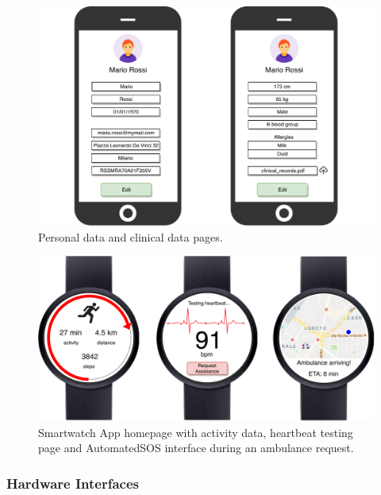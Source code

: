 \documentclass[12pt,a4paper]{article}
\begin{document}
					\begin{figure}[H]
						\centering
						\includegraphics[width=1.0\linewidth]{Images/data-pages}
						\caption{Personal data and clinical data pages.}
						\label{fig:data-pages}
					\end{figure}
					\begin{figure}[h]
						\centering
						\includegraphics[width=1.0\linewidth]{Images/smartwatch}
						\caption{Smartwatch App homepage with activity data, heartbeat testing page and AutomatedSOS interface during an ambulance request.}
						\label{fig:smartwatch}
					\end{figure}

	\newpage
	\subsubsection{Hardware Interfaces}
\end{document}
